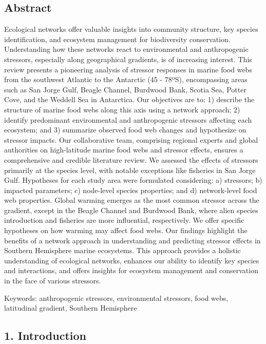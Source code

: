 \documentclass[
]{article}
\begin{document}
\hypertarget{abstract}{%
\subsection{Abstract}\label{abstract}}

Ecological networks offer valuable insights into community structure,
key species identification, and ecosystem management for biodiversity
conservation. Understanding how these networks react to environmental
and anthropogenic stressors, especially along geographical gradients, is
of increasing interest. This review presents a pioneering analysis of
stressor responses in marine food webs from the southwest Atlantic to
the Antarctic (45 - 78ºS), encompassing areas such as San Jorge Gulf,
Beagle Channel, Burdwood Bank, Scotia Sea, Potter Cove, and the Weddell
Sea in Antarctica. Our objectives are to: 1) describe the structure of
marine food webs along this axis using a network approach; 2) identify
predominant environmental and anthropogenic stressors affecting each
ecosystem; and 3) summarize observed food web changes and hypothesize on
stressor impacts. Our collaborative team, comprising regional experts
and global authorities on high-latitude marine food webs and stressor
effects, ensures a comprehensive and credible literature review. We
assessed the effects of stressors primarily at the species level, with
notable exceptions like fisheries in San Jorge Gulf. Hypotheses for each
study area were formulated considering: a) stressors; b) impacted
parameters; c) node-level species properties; and d) network-level food
web properties. Global warming emerges as the most common stressor
across the gradient, except in the Beagle Channel and Burdwood Bank,
where alien species introduction and fisheries are more influential,
respectively. We offer specific hypotheses on how warming may affect
food webs. Our findings highlight the benefits of a network approach in
understanding and predicting stressor effects in Southern Hemisphere
marine ecosystems. This approach provides a holistic understanding of
ecological networks, enhances our ability to identify key species and
interactions, and offers insights for ecosystem management and
conservation in the face of various stressors.

Keywords: anthropogenic stressors, environmental stressors, food webs,
latitudinal gradient, Southern Hemisphere

\hypertarget{introduction}{%
\subsection{1. Introduction}\label{introduction}}
\end{document}
